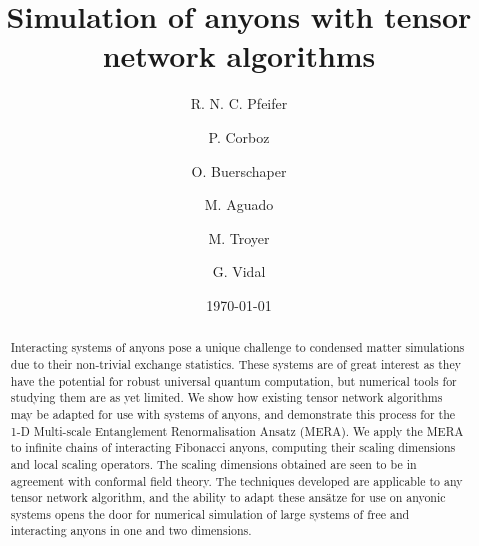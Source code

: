 \documentclass[aps,prb,reprint,superscriptaddress,amsfonts,amsmath,amssymb,showpacs,floatfix]{revtex4-1}
\begin{document}
\title{Simulation of anyons with tensor network algorithms}

\author{R. N. C. Pfeifer}
\author{P. Corboz}
\author{O. Buerschaper}
\author{M. Aguado}
\author{M. Troyer}
\author{G. Vidal}

\date{\today}

\begin{abstract}
Interacting systems of anyons pose a unique challenge to condensed matter simulations due to their non-trivial exchange statistics. These systems are of great interest as they have the potential for robust universal quantum computation, but numerical tools for studying them are as yet limited. We show how existing tensor network algorithms may be adapted for use with systems of anyons, and demonstrate this process for the 1-D Multi-scale Entanglement Renormalisation Ansatz (MERA). We apply the MERA to infinite chains of interacting Fibonacci anyons, computing their scaling dimensions and local scaling operators. The scaling dimensions obtained are seen to be in agreement with conformal field theory. The techniques developed are applicable to any tensor network algorithm, and the ability to adapt these ans\"atze for use on anyonic systems opens the door for numerical simulation of large systems of free and interacting anyons in one and two dimensions.
\end{abstract}
\end{document}
